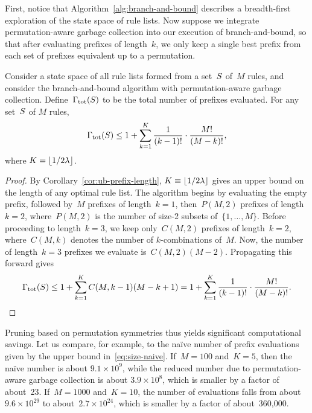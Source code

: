 First, notice that Algorithm~\ref{alg:branch-and-bound} describes a
breadth-first exploration of the state space of rule lists.
%
Now suppose we integrate permutation-aware garbage collection into
our execution of branch-and-bound, so that after evaluating
prefixes of length~$k$, we only keep a single best prefix
from each set of prefixes equivalent up to a permutation.

\begin{theorem}
%
Consider a state space of all rule lists formed from a set~$S$
of~$M$ rules, and consider the branch-and-bound algorithm with
permutation-aware garbage collection.
%
Define~${\Gamma_{\textnormal{tot}}}(S)$ to be the total number of prefixes evaluated.
%
For any set~$S$ of $M$ rules,
\begin{align}
\TotalRemaining(\RuleSet)
\le  1 + \sum_{k=1}^K \frac{1}{(k - 1)!} \cdot \frac{M!}{(M - k)!},
\end{align}
where ${K = \lfloor 1 / 2 {\lambda} \rfloor}$.
\end{theorem}

\begin{proof}
By Corollary~\ref{cor:ub-prefix-length},
${K \equiv \lfloor 1 / 2 {\lambda} \rfloor}$
gives an upper bound on the length of any optimal rule list.
%
The algorithm begins by evaluating the empty prefix,
followed by~$M$ prefixes of length~${k=1}$,
then~${P(M, 2)}$ prefixes of length~${k=2}$,
where~${P(M, 2)}$ is the number of size-2 subsets of~$\{1, \dots, M \}$.
%
Before proceeding to length~${k=3}$, we keep only~${C(M, 2)}$
prefixes of length~${k=2}$, where~${C(M, k)}$ denotes the
number of $k$-combinations of~$M$.
%
Now, the number of length~${k=3}$ prefixes we evaluate is~${C(M, 2) (M - 2)}$.
%
Propagating this forward gives
\begin{align}
\TotalRemaining(\RuleSet) \le 1 + \sum_{k=1}^K C(M, k-1) (M - k + 1)
= 1 + \sum_{k=1}^K \frac{1}{(k - 1)!} \cdot \frac{M!}{(M - k)!}.
\end{align}
\end{proof}

Pruning based on permutation symmetries thus yields significant
computational savings.
%
Let us compare, for example, to the na\"ive number of prefix evaluations
given by the upper bound in~\eqref{eq:size-naive}.
%
If~${M = 100}$ and~${K = 5}$, then the na\"ive number is about
${9.1 \times 10^9}$, while the reduced number due to permutation-aware
garbage collection is about ${3.9 \times 10^8}$,
which is smaller by a factor of about~23.
%
If~${M=1000}$ and~${K = 10}$, the number of evaluations falls from
about~${9.6 \times 10^{29}}$ to about~${2.7 \times 10^{24}}$,
which is smaller by a factor of about~360,000.
%

